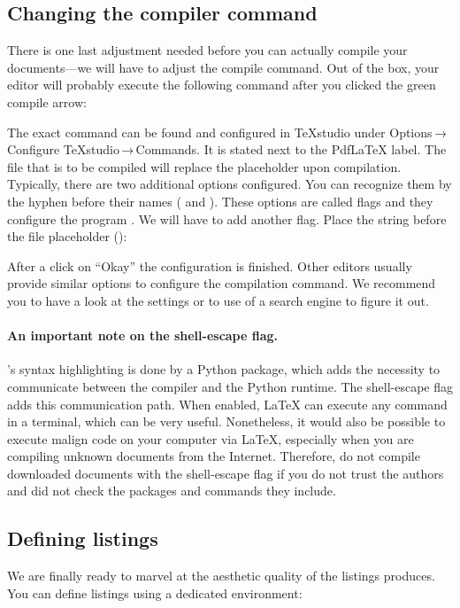 \subsection{Changing the compiler command}
There is one last adjustment needed before you can actually compile your documents---we will have to adjust the compile command.
Out of the box, your editor will probably execute the following command after you clicked the green compile arrow:


\noindent The exact command can be found and configured in \TeX{}studio under Options\,→\,Configure \TeX{}studio\,→\,Commands.
It is stated next to the Pdf\LaTeX{} label.
The file that is to be compiled will replace the placeholder  upon compilation.
Typically, there are two additional options configured.
You can recognize them by the hyphen before their names ( and ).
These options are called flags and they configure the program . 
We will have to add another flag.
Place the string  before the file placeholder ():


\noindent After a click on \enquote{Okay} the configuration is finished.
Other editors usually provide similar options to configure the compilation command.
We recommend you to have a look at the settings or to use of a search engine to figure it out.

\paragraph{An important note on the shell-escape flag.} 's syntax highlighting is done by a Python package, which adds the necessity to communicate between the compiler and the Python runtime.
The shell-escape flag adds this communication path.
When enabled, \LaTeX{} can execute any command in a terminal, which can be very useful.
Nonetheless, it would also be possible to execute malign code on your computer via \LaTeX{}, especially when you are compiling unknown documents from the Internet.
Therefore, do not compile downloaded documents with the shell-escape flag if you do not trust the authors and did not check the packages and commands they include.

\subsection{Defining listings}
We are finally ready to marvel at the aesthetic quality of the listings  produces.
You can define listings using a dedicated environment:


